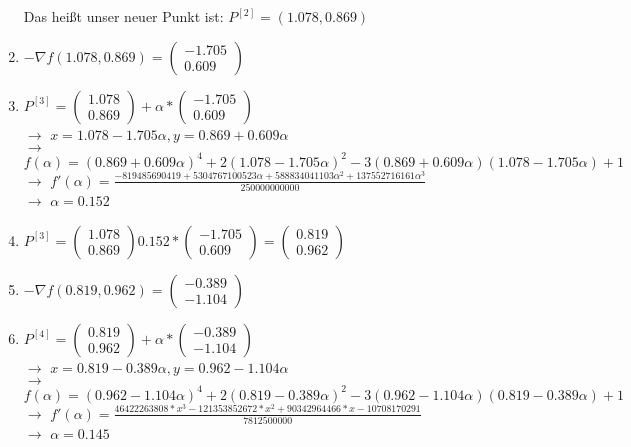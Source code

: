 \documentclass[a4paper, 11pt]{article}
\begin{document}
\begin{enumerate}
Das heißt unser neuer Punkt ist: $P^{[2]}=(1.078,0.869)$
	
	\item
	$-{\nabla}f(1.078,0.869) = \left( \begin{array}{c} -1.705 \\  0.609 \end{array} \right)$
	
	\item
	$P^{[3]}=\left( \begin{array}{c} 1.078 \\ 0.869 \end{array} \right) + \alpha * \left( \begin{array}{c} -1.705 \\ 0.609 \end{array} \right)$\\ $\rightarrow$ $x=1.078-1.705{\alpha}, y=0.869+0.609{\alpha}$\\ $\rightarrow$ $f({\alpha})=(0.869+0.609{\alpha})^4+2(1.078-1.705{\alpha})^2-3(0.869+0.609{\alpha})(1.078-1.705{\alpha})+1$\\ $\rightarrow$ $f'(\alpha)=\frac{-819485690419+5304767100523{\alpha}+588834041103{\alpha}^2+137552716161{\alpha}^3}{250000000000}$\\ $\rightarrow$ $\alpha=0.152$	
	
	\item
	$P^{[3]}=\left( \begin{array}{c} 1.078 \\ 0.869 \end{array} \right) 0.152 * \left( \begin{array}{c} -1.705 \\ 0.609 \end{array} \right) = \left( \begin{array}{c} 0.819\\ 0.962 \end{array} \right)$
	
	\item
	$-{\nabla}f(0.819,0.962) = \left( \begin{array}{c} -0.389 \\ -1.104 \end{array} \right)$
	
	\item
	$P^{[4]}=\left( \begin{array}{c} 0.819 \\ 0.962 \end{array} \right) + \alpha * \left( \begin{array}{c} -0.389 \\ -1.104 \end{array} \right)$\\ $\rightarrow$ $x=0.819-0.389{\alpha}, y=0.962-1.104{\alpha}$\\ $\rightarrow$ $f(\alpha)=(0.962-1.104{\alpha})^4+2(0.819-0.389{\alpha})^2-3(0.962-1.104{\alpha})(0.819-0.389{\alpha})+1$\\ $\rightarrow$ $f'(\alpha)=\frac{46422263808*x^3-121353852672*x^2+90342964466*x-10708170291}{7812500000}$\\ $\rightarrow$ $\alpha=0.145$
	

\end{enumerate}
\end{document}

